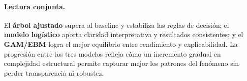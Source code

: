 \paragraph{Lectura conjunta.}
El \textbf{árbol ajustado} supera al baseline y estabiliza las reglas de decisión; el \textbf{modelo logístico} aporta claridad interpretativa y resultados consistentes; y el \textbf{GAM/EBM} logra el mejor equilibrio entre rendimiento y explicabilidad. La progresión entre los tres modelos refleja cómo un incremento gradual en complejidad estructural permite capturar mejor los patrones del fenómeno sin perder transparencia ni robustez.
